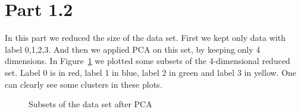\documentclass[12pt,a4paper]{article}
\begin{document}
\section*{Part 1.2}
In this part we reduced the size of the data set. First we kept only data with label 0,1,2,3. And then we applied PCA on this set, by keeping only 4 dimensions. 
In Figure~\ref{fig:reduced} we plotted some subsets of the 4-dimensional reduced set. Label 0 is in red, label 1 in blue, label 2 in green and label 3 in yellow.
One can clearly see some clusters in these plots.
\begin{figure}
    \centering
    \caption{Subsets of the data set after PCA}
    \label{fig:reduced}
\end{figure}
\end{document}
